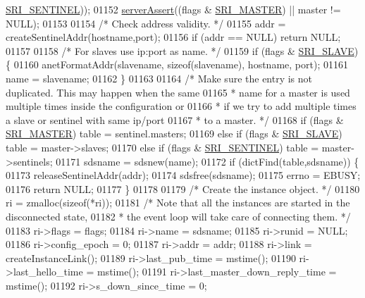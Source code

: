 \begin{DoxyCode}
{{{{{{{{{{{{{{{{      \hyperlink{sentinel_8c_a8ed55207b2af5d2dd314c951ef253f64}{SRI\_SENTINEL}));
01152     \hyperlink{server_8h_a88114b5169b4c382df6b56506285e56a}{serverAssert}((flags & \hyperlink{sentinel_8c_a2ee83e5ff67b45746cd6a310f15334b2}{SRI\_MASTER}) || master != NULL);
01153 
01154     \textcolor{comment}{/* Check address validity. */}
01155     addr = createSentinelAddr(hostname,port);
01156     \textcolor{keywordflow}{if} (addr == NULL) \textcolor{keywordflow}{return} NULL;
01157 
01158     \textcolor{comment}{/* For slaves use ip:port as name. */}
01159     \textcolor{keywordflow}{if} (flags & \hyperlink{sentinel_8c_a4b9db21eda79d49bd9fdf2cf7b3178e8}{SRI\_SLAVE}) \{
01160         anetFormatAddr(slavename, \textcolor{keyword}{sizeof}(slavename), hostname, port);
01161         name = slavename;
01162     \}
01163 
01164     \textcolor{comment}{/* Make sure the entry is not duplicated. This may happen when the same}
01165 \textcolor{comment}{     * name for a master is used multiple times inside the configuration or}
01166 \textcolor{comment}{     * if we try to add multiple times a slave or sentinel with same ip/port}
01167 \textcolor{comment}{     * to a master. */}
01168     \textcolor{keywordflow}{if} (flags & \hyperlink{sentinel_8c_a2ee83e5ff67b45746cd6a310f15334b2}{SRI\_MASTER}) table = sentinel.masters;
01169     \textcolor{keywordflow}{else} \textcolor{keywordflow}{if} (flags & \hyperlink{sentinel_8c_a4b9db21eda79d49bd9fdf2cf7b3178e8}{SRI\_SLAVE}) table = master->slaves;
01170     \textcolor{keywordflow}{else} \textcolor{keywordflow}{if} (flags & \hyperlink{sentinel_8c_a8ed55207b2af5d2dd314c951ef253f64}{SRI\_SENTINEL}) table = master->sentinels;
01171     sdsname = sdsnew(name);
01172     \textcolor{keywordflow}{if} (dictFind(table,sdsname)) \{
01173         releaseSentinelAddr(addr);
01174         sdsfree(sdsname);
01175         errno = EBUSY;
01176         \textcolor{keywordflow}{return} NULL;
01177     \}
01178 
01179     \textcolor{comment}{/* Create the instance object. */}
01180     ri = zmalloc(\textcolor{keyword}{sizeof}(*ri));
01181     \textcolor{comment}{/* Note that all the instances are started in the disconnected state,}
01182 \textcolor{comment}{     * the event loop will take care of connecting them. */}
01183     ri->flags = flags;
01184     ri->name = sdsname;
01185     ri->runid = NULL;
01186     ri->config\_epoch = 0;
01187     ri->addr = addr;
01188     ri->link = createInstanceLink();
01189     ri->last\_pub\_time = mstime();
01190     ri->last\_hello\_time = mstime();
01191     ri->last\_master\_down\_reply\_time = mstime();
01192     ri->s\_down\_since\_time = 0;
}}}}}}}}}}}}}}}}
\end{DoxyCode}
